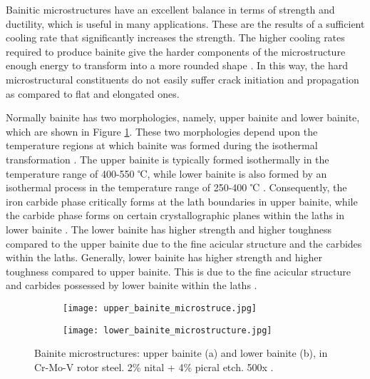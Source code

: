 Bainitic microstructures have an excellent balance in terms of strength and ductility, which is useful in many applications. These are the results of a sufficient cooling rate that significantly increases the strength. The higher cooling rates required to produce bainite give the harder components of the microstructure enough energy to transform into a more rounded shape \cite{bajaj2020steels}. In this way, the hard microstructural constituents do not easily suffer crack initiation and propagation as compared to flat and elongated ones.

Normally bainite has two morphologies, namely, upper bainite and lower bainite, which are shown in Figure \ref{ch3:figure:bainite:microstructures}. These two morphologies depend upon the temperature regions at which bainite was formed during the isothermal transformation \cite{molabe2018determining}. The upper bainite is typically formed isothermally in the temperature range of 400-550 ℃, while lower bainite is also formed by an isothermal process in the temperature range of 250-400 ℃ \cite{molabe2018determining}. Consequently, the iron carbide phase critically forms at the lath boundaries in upper bainite, while the carbide phase forms on certain crystallographic planes within the laths in lower bainite \cite{bajaj2020steels}. The lower bainite has higher strength and higher toughness compared to the upper bainite due to the fine acicular structure and the carbides within the laths. Generally, lower bainite has higher strength and higher toughness compared to upper bainite. This is due to the fine acicular structure and carbides possessed by lower bainite within the laths \cite{molabe2018determining}.
     
\begin{figure}[H]

\centering
\begin{subfigure}{.45\textwidth}
    \centering
    \texttt{[image: upper\_bainite\_microstruce.jpg]}
    \caption{}
\end{subfigure}
\begin{subfigure}{.45\textwidth}
    \centering
    \texttt{[image: lower\_bainite\_microstructure.jpg]}
    \caption{}
\end{subfigure}

\caption{Bainite microstructures: upper bainite (a) and lower bainite (b), in Cr-Mo-V rotor steel. 2\% nital + 4\% picral etch. 500x \cite{molabe2018determining}.}
\label{ch3:figure:bainite:microstructures}
\end{figure}


